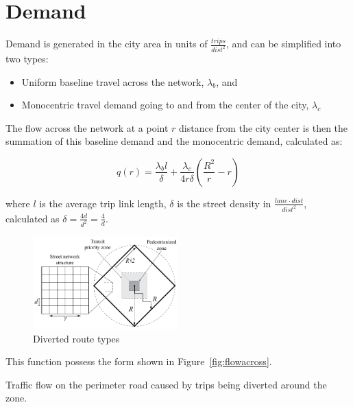 \documentclass{article}
\begin{document}
\section{Demand}
Demand is generated in the city area in units of $\frac{trips}{dist^2}$, and can be simplified into two types: 

\begin{itemize}[topsep=3pt, itemsep=3pt, partopsep=3pt, parsep=3pt]
    \item Uniform baseline travel across the network, $\lambda_b$, and
    \item Monocentric travel demand going to and from the center of the city, $\lambda_c$
\end{itemize}

\noindent The flow across the network at a point $r$ distance from the city center is then the summation of this baseline demand and the monocentric demand, calculated as:

\begin{equation}
    q(r) = \frac{\lambda_b l}{\delta} + \frac{\lambda_c}{4r\delta} \left( \frac{R^2}{r} - r \right)
\end{equation}

\noindent where $l$ is the average trip link length, $\delta$ is the street density in $\frac{lane \cdot dist}{dist^2}$, calculated as $\delta = \frac{4d}{d^2} = \frac{4}{d}$.


\begin{figure}[!ht]
     \centering
     \includegraphics[width=0.5\textwidth]{diagram_pedtransit_grid_city}
     \caption{Diverted route types}
     \label{fig:diverted}
\end{figure}


This function possess the form shown in Figure~\ref{fig:flowacross}. 

Traffic flow on the perimeter road caused by trips being diverted around the zone.
\end{document}
